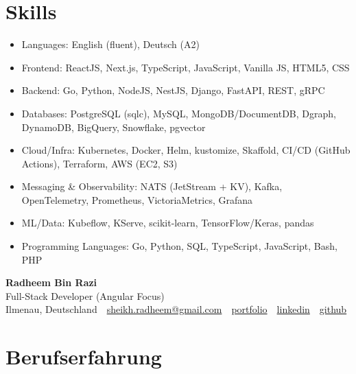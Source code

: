 \documentclass[10pt,a4paper]{resume}
\makeatletter
\newcommand{\Portfolio}{https://radheem.github.io/my-cv}
\newcommand{\PortfolioText}{portfolio}
\newcommand{\GitHub}{https://github.com/radheem}
\newcommand{\LinkedIn}{https://www.linkedin.com/in/radheem-razi}
\newcommand{\Email}{sheikh.radheem@gmail.com}
\makeatother
\begin{document}
\section{Skills}

\begin{itemize}[leftmargin=1.4em,nosep,topsep=2pt]
  \item Languages: English (fluent), Deutsch (A2)
  \item Frontend: ReactJS, Next.js, TypeScript, JavaScript, Vanilla JS, HTML5, CSS
  \item Backend: Go, Python, NodeJS, NestJS, Django, FastAPI, REST, gRPC
  \item Databases: PostgreSQL (sqlc), MySQL, MongoDB/DocumentDB, Dgraph, DynamoDB, BigQuery, Snowflake, pgvector
  \item Cloud/Infra: Kubernetes, Docker, Helm, kustomize, Skaffold, CI/CD (GitHub Actions), Terraform, AWS (EC2, S3)
  \item Messaging \& Observability: NATS (JetStream + KV), Kafka, OpenTelemetry, Prometheus, VictoriaMetrics, Grafana
  \item ML/Data: Kubeflow, KServe, scikit-learn, TensorFlow/Keras, pandas
  \item Programming Languages: Go, Python, SQL, TypeScript, JavaScript, Bash, PHP
\end{itemize}

\clearpage
{}

\begin{center}
  {\huge\bfseries Radheem Bin Razi}\\[3pt]
  {\large Full-Stack Developer (Angular Focus)}\\[6pt]
  \small
  Ilmenau, Deutschland \,\textbar\,
  \href{mailto:\Email}{\Email} \,\textbar\,
  \href{\Portfolio}{\PortfolioText} \,\textbar\,
  \href{\LinkedIn}{linkedin} \,\textbar\,
  \href{\GitHub}{github}
\end{center}
\vspace{2pt}

\section{Berufserfahrung}
\end{document}
